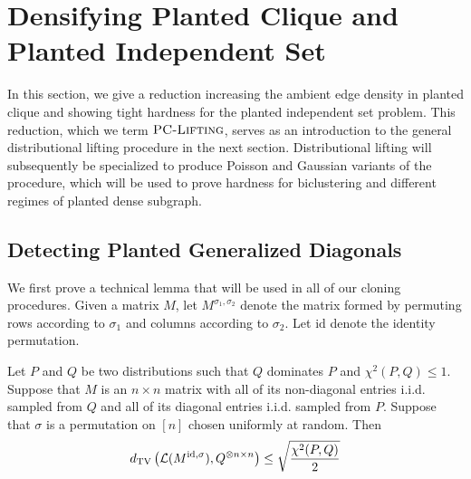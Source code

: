 \section{Densifying Planted Clique and Planted Independent Set}
\label{s:lifting}

In this section, we give a reduction increasing the ambient edge density in planted clique and showing tight hardness for the planted independent set problem. This reduction, which we term $\textsc{PC-Lifting}$, serves as an introduction to the general distributional lifting procedure in the next section. Distributional lifting will subsequently be specialized to produce Poisson and Gaussian variants of the procedure, which will be used to prove hardness for biclustering and different regimes of planted dense subgraph.

\subsection{Detecting Planted Generalized Diagonals}

We first prove a technical lemma that will be used in all of our cloning procedures. Given a matrix $M$, let $M^{\sigma_1, \sigma_2}$ denote the matrix formed by permuting rows according to $\sigma_1$ and columns according to $\sigma_2$. Let $\text{id}$ denote the identity permutation.

\begin{lemma} \label{lem:4a}
Let $P$ and $Q$ be two distributions such that $Q$ dominates $P$ and $\chi^2(P, Q) \le 1$. Suppose that $M$ is an $n \times n$ matrix with all of its non-diagonal entries i.i.d. sampled from $Q$ and all of its diagonal entries i.i.d. sampled from $P$. Suppose that $\sigma$ is a permutation on $[n]$ chosen uniformly at random. Then
$$d_{\text{TV}}\left( \mathcal{L}(M^{\text{id},\sigma}), Q^{\otimes n \times n} \right) \le \sqrt{\frac{\chi^2(P, Q)}{2}}$$
\end{lemma}

